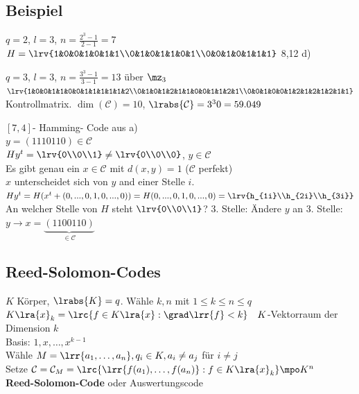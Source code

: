 	\subsection{Beispiel}
		\item $ q=2 $, $ l=3 $, $ n=\frac{2^3-1}{2-1}=7 $\\
		$ H=\lrv{1&0&0&1&0&1&1\\0&1&0&1&1&0&1\\0&0&1&0&1&1&1} $ 8,12 d)
		\item $ q=3 $, $l=3$, $n=\frac{3^3-1}{3-1}=13$ über $ \mz_3 $\\
		$ \lrv{1&0&0&1&1&0&0&1&1&1&1&1&2\\0&1&0&1&2&1&1&0&0&1&1&2&1\\0&0&1&0&0&1&2&1&2&1&2&1&1} $ Kontrollmatrix. $ \dim(\mathcal{C})=10 $, $ \lrabs{\mathcal{C}}=3^30=59.049 $
		\item  $ [7,4] $- Hamming- Code aus a)\\
		$ y=(1110110)\in \mathcal{C} $\\
		$ Hy^t=\lrv{0\\0\\1}\neq\lrv{0\\0\\0} $, $ y\in \mathcal{C} $\\
		Es gibt genau ein $ x\in \mathcal{C} $ mit $ d(x,y)=1 $ ($ \mathcal{C} $ perfekt)\\
		$ x $ unterscheidet sich von $ y $ and einer Stelle $ i $.\\
		$ Hy^t=H(x^t+(0,...,0,1,0,...,0))=H(0,...,0,1,0,...,0)=\lrv{h_{1i}\\h_{2i}\\h_{3i}} $\\
		An welcher Stelle von $ H $ steht $ \lrv{0\\0\\1} $? 3. Stelle: Ändere $ y $ an 3. Stelle: $ y\rightarrow x=\underbrace{(1100110)}_{\in \mathcal{C}} $
	\subExEnd
	
	\subsection{Reed-Solomon-Codes}
		\item $K$ Körper, $\lrabs{K}=q$. Wähle $k,n$ mit $1\leq k\leq n\leq q$\\
			$K\lra{x}_k=\lrc{f\in K\lra{x}: \grad\lrr{f}<k}\quad K$-Vektorraum der Dimension $k$\\
			Basis: $1,x,\dots,x^{k-1}$\\
			Wähle $M=\lrr{a_1,\dots,a_n}, q_i\in K, a_i\neq a_j$ für $i\neq j$\\
			Setze $\mathcal{C}=\mathcal{C}_M=\lrc{\lrr{f(a_1),\dots,f(a_n)}:f\in K\lra{x}_k}\mpo K^n$\\
			\textbf{Reed-Solomon-Code} oder Auswertungscode
			
